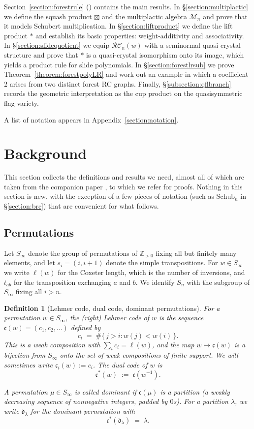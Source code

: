 \documentclass[pdflatex,sn-mathphys-num]{sn-jnl}
\numberwithin{equation}{subsection}
\newcommand{\RC}{\mathcal{RC}}
\newcommand{\dom}{\mathfrak{d}}
\newcommand{\code}{\mathfrak{c}}
\theoremstyle{thmstyleone}
\theoremstyle{thmstylethree}
\newtheorem{definition}[lemma]{Definition}
\theoremstyle{thmstyletwo}
\begin{document}
Section~\ref{section:forestrule} () contains the main results. In \S\ref{section:multiplactic} we define the squash product $\boxtimes$ and the multiplactic algebra $\mathcal{M}_n$ and prove that it models Schubert multiplication. In \S\ref{section:liftproduct} we define the lift product $*$ and establish its basic properties: weight-additivity and associativity. In \S\ref{section:slidequotient} we equip $\RC_n(w)$ with a seminormal quasi-crystal structure and prove that $*$ is a quasi-crystal isomorphism onto its image, which yields a product rule for slide polynomials. In \S\ref{section:forestlrsub} we prove Theorem~\ref{theorem:forestpolyLR} and work out an example in which a coefficient $2$ arises from two distinct forest RC graphs. Finally, \S\ref{subsection:qflbranch} records the geometric interpretation as the cup product on the quasisymmetric flag variety.

A list of notation appears in Appendix~\ref{section:notation}.


\section{Background}\label{section:background}

This section collects the definitions and results we need, almost all of which are taken from the companion paper \cite{samuelbialgebra}, to which we refer for proofs. Nothing in this section is new, with the exception of a few pieces of notation (such as $\mathrm{Schub}_n$ in \S\ref{section:brc}) that are convenient for what follows.

\subsection{Permutations}\label{section:perms}

Let $S_\infty$ denote the group of permutations of $\mathbb{Z}_{>0}$ fixing all but finitely many elements, and let $s_i=(i,i+1)$ denote the simple transpositions. For $w\in S_\infty$ we write $\ell(w)$ for the Coxeter length, which is the number of inversions, and $t_{ab}$ for the transposition exchanging $a$ and $b$. We identify $S_n$ with the subgroup of $S_\infty$ fixing all $i>n$.

\begin{definition}[Lehmer code, dual code, dominant permutations]\label{definition:codestuff}
For a permutation $w\in S_\infty$, the \emph{(right) Lehmer code} of $w$ is the sequence $\code(w)=(c_1,c_2,\ldots)$ defined by
$$c_i \;=\; \#\{\,j>i : w(j)<w(i)\,\}.$$
This is a weak composition with $\sum_i c_i=\ell(w)$, and the map $w\mapsto\code(w)$ is a bijection from $S_\infty$ onto the set of weak compositions of finite support. We will sometimes write $\code_i(w):=c_i$. The \emph{dual code} of $w$ is
$$\code^*(w) \;:=\; \code(w^{-1}).$$

A permutation $\mu\in S_\infty$ is called \emph{dominant} if $\code(\mu)$ is a partition (a weakly decreasing sequence of nonnegative integers, padded by $0$s). For a partition $\lambda$, we write $\dom_\lambda$ for the dominant permutation with
$$\code^*(\dom_\lambda) \;=\; \lambda.$$
\end{definition}
\end{document}
